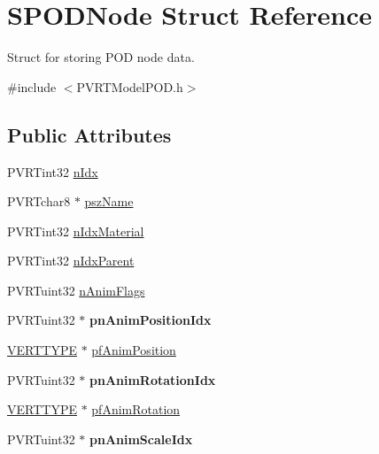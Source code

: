 \hypertarget{struct_s_p_o_d_node}{\section{S\+P\+O\+D\+Node Struct Reference}
\label{struct_s_p_o_d_node}
}


Struct for storing P\+O\+D node data.  




{\ttfamily \#include $<$P\+V\+R\+T\+Model\+P\+O\+D.\+h$>$}

\subsection*{Public Attributes}
\begin{DoxyCompactItemize}
\item 
P\+V\+R\+Tint32 \hyperlink{struct_s_p_o_d_node_a6fe7da92da2eb29226a03a012b6418b5}{n\+Idx}
\item 
P\+V\+R\+Tchar8 $\ast$ \hyperlink{struct_s_p_o_d_node_a98df89ff10b3189f704a0cb43aa88ecd}{psz\+Name}
\item 
P\+V\+R\+Tint32 \hyperlink{struct_s_p_o_d_node_ac2a421119e765aeaec00697a51025fa3}{n\+Idx\+Material}
\item 
P\+V\+R\+Tint32 \hyperlink{struct_s_p_o_d_node_a93599403158cd8d7c5395dec70427d9c}{n\+Idx\+Parent}
\item 
P\+V\+R\+Tuint32 \hyperlink{struct_s_p_o_d_node_a4cc0807c7e832632a0c8725f2903bf6a}{n\+Anim\+Flags}
\item 
\hypertarget{struct_s_p_o_d_node_a5bc72d3ad97e1976f23c58a2bc0b0d45}{P\+V\+R\+Tuint32 $\ast$ {\bfseries pn\+Anim\+Position\+Idx}}\label{struct_s_p_o_d_node_a5bc72d3ad97e1976f23c58a2bc0b0d45}

\item 
\hyperlink{group___a_p_i___o_g_l_e_s_ga06da457b7d3e93368ab904f89e1396be}{V\+E\+R\+T\+T\+Y\+P\+E} $\ast$ \hyperlink{struct_s_p_o_d_node_a0db7cb2e3efe3080628feda0eb64e659}{pf\+Anim\+Position}
\item 
\hypertarget{struct_s_p_o_d_node_ab2bf7b000da7daa40e5993f1a8de3e9b}{P\+V\+R\+Tuint32 $\ast$ {\bfseries pn\+Anim\+Rotation\+Idx}}\label{struct_s_p_o_d_node_ab2bf7b000da7daa40e5993f1a8de3e9b}

\item 
\hyperlink{group___a_p_i___o_g_l_e_s_ga06da457b7d3e93368ab904f89e1396be}{V\+E\+R\+T\+T\+Y\+P\+E} $\ast$ \hyperlink{struct_s_p_o_d_node_aae8ad1211d2accf32afbee44f077dd6f}{pf\+Anim\+Rotation}
\item 
\hypertarget{struct_s_p_o_d_node_a693292258c0fe5968363663a34e476cc}{P\+V\+R\+Tuint32 $\ast$ {\bfseries pn\+Anim\+Scale\+Idx}}\label{struct_s_p_o_d_node_a693292258c0fe5968363663a34e476cc}


\end{DoxyCompactItemize}
